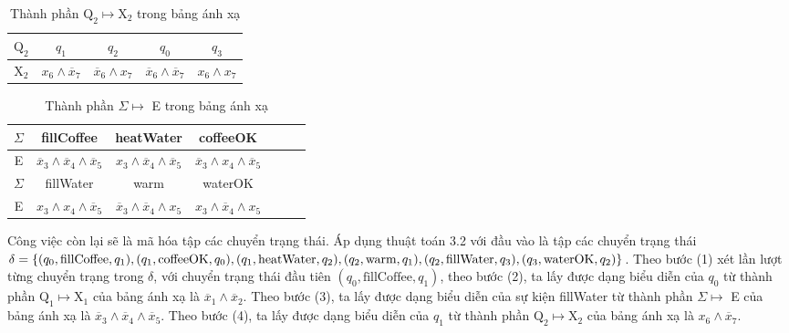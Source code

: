 \documentclass[a4paper,13pt,oneside,openany]{book}
\begin{document}
\begin{flushleft}
	\begin{table}[!ht]
		\centering
		\renewcommand{\arraystretch}{1.25}
		\begin{tabular}{|c|c|c|c|c|}
			\hline
			$\textrm{Q}_2$ & $q_1$ & $q_2$ & $q_0$ & $q_3$\\
			\hline
			$\textrm{X}_2$ & $x_6 \land \overline{x}_7$ & $\overline{x}_6\land x_7$ & $\overline{x}_6\land \overline{x}_7$ &
			$x_6 \land x_7$\\
			\hline
		\end{tabular}
		\caption{Thành phần $\textrm{Q}_2 \mapsto \textrm{X}_2$ trong bảng ánh xạ}
	\end{table}
	
	\begin{table}[!ht]
		\centering
		\renewcommand{\arraystretch}{1.25}
		\begin{tabular}{|c|c|c|c|c|c|c|}
			\hline
			$\Sigma$ & fillCoffee & heatWater & coffeeOK\\
			\hline
			E & $\overline{x}_3 \land \overline{x}_4 \land \overline{x}_5$ & $x_3 \land \overline{x}_4 \land \overline{x}_5$ & $\overline{x}_3 \land x_4 \land \overline{x}_5$\\
			\hline
			$\Sigma$ & fillWater & warm & waterOK\\
			\hline
			E &  $x_3 \land x_4 \land \overline{x}_5$ & $\overline{x}_3 \land \overline{x}_4 \land x_5$ & $x_3 \land \overline{x}_4 \land x_5$\\
			\hline
		\end{tabular}
		\caption{Thành phần $\Sigma \mapsto$ E trong bảng ánh xạ}
	\end{table}
	\noindent
	Công việc còn lại sẽ là mã hóa tập các chuyển trạng thái. Áp dụng thuật toán 3.2 với đầu vào là tập các chuyển trạng thái $\delta = \{(q_0, \textrm{fillCoffee}, q_1), (q_1, \textrm{coffeeOK}, q_0),\\
	(q_1, \textrm{heatWater}, q_2), (q_2, \textrm{warm}, q_1), (q_2, \textrm{fillWater}, q_3), (q_3, \textrm{waterOK}, q_2)\}$. Theo bước (1) xét lần lượt từng chuyển trạng trong $\delta$, với chuyển trạng thái đầu tiên $(q_0, \textrm{fillCoffee}, q_1)$, theo bước (2), ta lấy được dạng biểu diễn của $q_0$ từ thành phần $\textrm{Q}_1 \mapsto \textrm{X}_1$ của bảng ánh xạ là $\overline{x}_1 \land \overline{x}_2$. Theo bước (3), ta lấy được dạng biểu diễn của sự kiện fillWater từ thành phần $\Sigma \mapsto$ E của bảng ánh xạ là $\overline{x}_3 \land \overline{x}_4 \land \overline{x}_5$. Theo bước (4), ta lấy được dạng biểu diễn của $q_1$ từ thành phần 
	$\textrm{Q}_2 \mapsto \textrm{X}_2$ của bảng ánh xạ là $x_6 \land \overline{x}_7$.

\end{flushleft}
\end{document}
